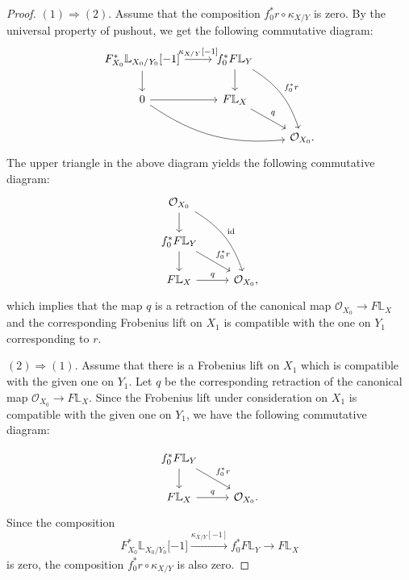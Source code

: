 \documentclass[11pt, a4paper]{amsart}
\theoremstyle{plain}
\theoremstyle{definition}
\begin{document}
\begin{proof}
$(1)\Rightarrow (2)$. Assume that the composition $f_0^*r\circ \kappa_{X/Y}$ is zero. By the universal property of pushout, we get the following commutative diagram:
\[
\begin{tikzcd}
  F^*_{X_0}\mathbb L_{X_0/Y_0} \lbrack -1 \rbrack \arrow[r, "\kappa_{X/Y}\lbrack -1\rbrack "] \arrow[d,] 
    & f^*_0F\mathbb L_{Y} \arrow[d, ] \arrow[ddr, "f^*_0r", bend left=20] \\
  0 \arrow[r, ] \arrow[drr, bend right=20] 
    & F\mathbb L_X \arrow[dr, "q"] \\
  & & \mathcal O_{X_0}.
\end{tikzcd}
\]
The upper triangle in the above diagram yields the following commutative diagram:
\[
\begin{tikzcd}
  \mathcal O_{X_0} \arrow[d] \arrow[ddr, "\mathrm{id}", bend left=20] & \\
  f^*_0F\mathbb L_{Y} \arrow[d] \arrow[dr, "f^*_0r"] & \\
  F\mathbb L_X \arrow[r, "q"] & \mathcal O_{X_0},
\end{tikzcd}
\]
which implies that the map $q$ is a retraction of the canonical map $\mathcal O_{X_0}\to F\mathbb L_X$ and the corresponding Frobenius lift on $X_1$ is compatible with the one on $Y_1$ corresponding to $r$.

$(2)\Rightarrow (1)$. Assume that there is a Frobenius lift on $X_1$ which is compatible with the given one on $Y_1$. Let $q$ be the corresponding retraction of the canonical map $ \mathcal O_{X_0}\to F\mathbb L_X$. Since the Frobenius lift under consideration on $X_1$ is compatible with the given one on $Y_1$, we have the following commutative diagram:

\[\begin{tikzcd}
    f_0^*F\mathbb L_Y \arrow[d] \arrow[dr, "f_0^*r"] &\\
    F\mathbb L_X \arrow[r, "q"] & \mathcal O_{X_0}.
\end{tikzcd}\]
Since the composition
\[ F^*_{X_0}\mathbb L_{X_0/Y_0} \lbrack -1 \rbrack \xrightarrow[]{\kappa_{X/Y}[-1]}f_0^*F\mathbb L_Y\to F\mathbb L_X\]
 is zero, the composition $f^*_0r\circ \kappa_{X/Y}$ is also zero.

\end{proof}
\end{document}

